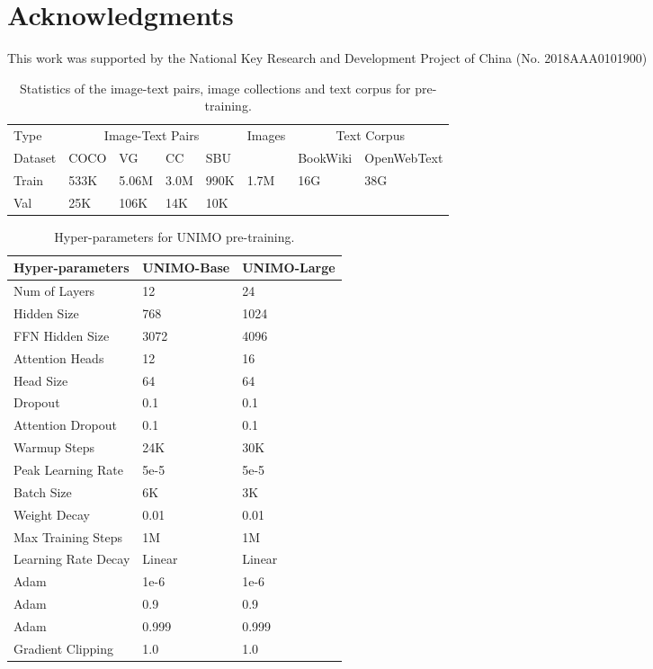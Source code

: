 \documentclass[11pt,a4paper]{article}
\begin{document}
\section*{Acknowledgments}
This work was supported by the National Key Research and Development Project of China (No. 2018AAA0101900)




\cleardoublepage

\appendix


\begin{table*}[t!]
\centering
\small
\begin{tabular}{l|l|l|l|l|l|l|l}
\hline
Type& \multicolumn{4}{c|}{Image-Text Pairs} & \multirow{2}{*}{Images} & \multicolumn{2}{c}{Text Corpus} \\
\cline{1-5} \cline{7-8}
Dataset & COCO & VG & CC & SBU & & BookWiki & OpenWebText \\
\hline
Train & 533K & 5.06M & 3.0M & 990K & 1.7M & 16G & 38G \\
Val & 25K & 106K & 14K & 10K & & & \\
\hline
\end{tabular}
\caption{\label{pretrain-dataset}
Statistics of the image-text pairs, image collections and text corpus for pre-training.}
\end{table*}



\begin{table}[t!]
\centering
\small
\begin{tabular}{l|l|l}
\hline
Hyper-parameters & UNIMO-Base & UNIMO-Large\\
\hline
Num of Layers & 12 & 24 \\
Hidden Size & 768 & 1024 \\
FFN Hidden Size & 3072 & 4096 \\
Attention Heads & 12 & 16 \\
Head Size & 64 & 64 \\
Dropout & 0.1 & 0.1 \\
Attention Dropout & 0.1 & 0.1 \\
Warmup Steps & 24K & 30K \\
Peak Learning Rate & 5e-5 & 5e-5 \\
Batch Size & 6K & 3K \\
Weight Decay & 0.01 & 0.01 \\
Max Training Steps & 1M & 1M \\
Learning Rate Decay & Linear & Linear \\
Adam  & 1e-6 & 1e-6 \\
Adam  & 0.9 & 0.9 \\
Adam  & 0.999 & 0.999 \\
Gradient Clipping & 1.0 & 1.0 \\
\hline
\end{tabular}
\caption{\label{pre-params}
Hyper-parameters for UNIMO pre-training.}
\end{table}
\end{document}
